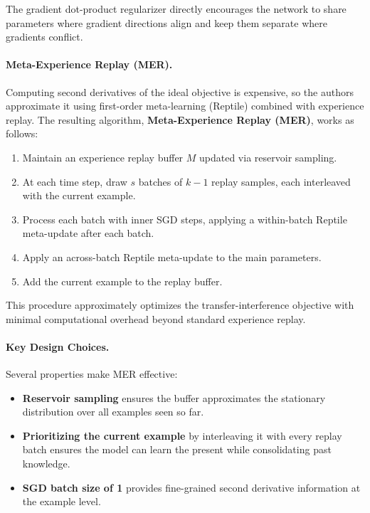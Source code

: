\documentclass[12pt]{article}
\begin{document}
The gradient dot-product regularizer directly encourages the network to share
parameters where gradient directions align and keep them separate where
gradients conflict.

\paragraph{Meta-Experience Replay (MER).}
Computing second derivatives of the ideal objective is expensive, so the authors
approximate it using first-order meta-learning (Reptile) combined with experience
replay. The resulting algorithm, \textbf{Meta-Experience Replay (MER)}, works
as follows:

\begin{enumerate}
		\item Maintain an experience replay buffer $M$ updated via reservoir sampling.
		\item At each time step, draw $s$ batches of $k{-}1$ replay samples, each
				interleaved with the current example.
		\item Process each batch with inner SGD steps, applying a within-batch
				Reptile meta-update after each batch.
		\item Apply an across-batch Reptile meta-update to the main parameters.
		\item Add the current example to the replay buffer.
\end{enumerate}

This procedure approximately optimizes the transfer-interference objective with
minimal computational overhead beyond standard experience replay.

\paragraph{Key Design Choices.}
Several properties make MER effective:

\begin{itemize}
		\item \textbf{Reservoir sampling} ensures the buffer approximates the
				stationary distribution over all examples seen so far.
		\item \textbf{Prioritizing the current example} by interleaving it with
				every replay batch ensures the model can learn the present while
				consolidating past knowledge.
		\item \textbf{SGD batch size of 1} provides fine-grained second derivative
				information at the example level.
\end{itemize}
\end{document}
